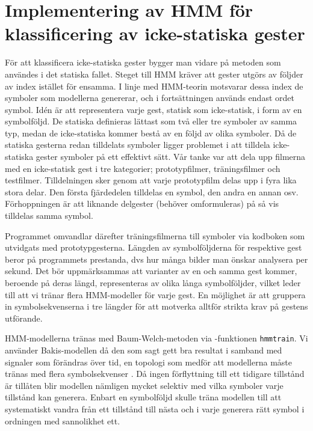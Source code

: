 \documentclass[../rapport_MVEX01-11-05]{subfiles}
\begin{document}
\section{Implementering av HMM för klassificering av icke-statiska gester}
För att klassificera icke-statiska gester bygger man vidare på metoden som användes i det 
statiska fallet. Steget till HMM kräver att gester utgörs av följder av index istället
för ensamma. I linje med HMM-teorin motsvarar dessa index de symboler som modellerna genererar, 
och i fortsättningen används endast ordet symbol. Idén är att representera varje gest, statisk som icke-statisk, i form av 
en symbolföljd. De statiska definieras lättast som två eller tre symboler av samma typ, medan 
de icke-statiska kommer bestå av en följd av olika symboler. Då de statiska gesterna redan tilldelats
symboler ligger problemet i att tilldela icke-statiska gester symboler på ett effektivt sätt. Vår tanke
var att dela upp filmerna med en icke-statisk gest i tre kategorier; prototypfilmer, träningsfilmer och 
testfilmer. Tilldelningen sker genom att varje prototypfilm delas upp i fyra lika stora delar. Den 
första fjärdedelen tilldelas en symbol, den andra en annan osv. Förhoppningen är att liknande 
delgester (behöver omformuleras) på så vis tilldelas samma symbol. 

Programmet omvandlar därefter träningsfilmerna till symboler via kodboken som utvidgats 
med prototypgesterna. Längden av 
symbolföljderna för respektive gest beror på programmets prestanda, dvs hur många bilder 
man önskar analysera per sekund. Det bör uppmärksammas att varianter av en och samma gest 
kommer, beroende på deras längd, representeras av olika långa symbolföljder, vilket leder till 
att vi tränar flera HMM-modeller för varje gest. En möjlighet är att gruppera in symbolsekvenserna 
i tre längder för att motverka alltför strikta krav på gestens utförande. 

HMM-modellerna tränas med Baum-Welch-metoden via \MATLAB-funktionen \texttt{hmmtrain}. Vi använder Bakis-modellen 
då den som sagt gett bra resultat i samband med signaler som förändras över tid, en topologi som medför att
modellerna måste tränas med flera symbolsekvenser \cite{Rabiner89}. Då ingen förflyttning till ett tidigare
tillstånd är tillåten blir modellen nämligen mycket selektiv med vilka symboler varje tillstånd kan generera. 
Enbart en symbolföljd skulle träna modellen till att systematiskt vandra från ett tillstånd till nästa och i 
varje generera rätt symbol i ordningen med sannolikhet ett. 
\end{document}
